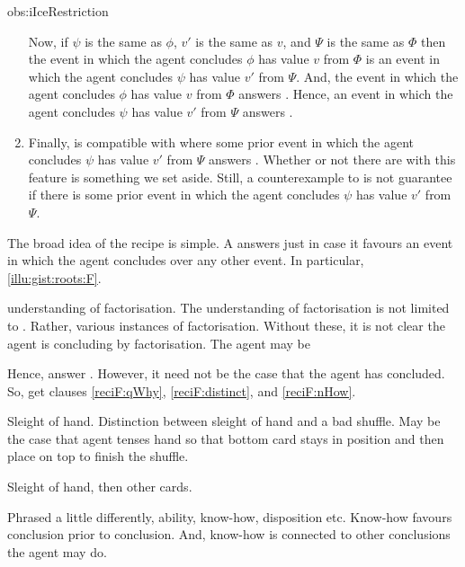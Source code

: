 \begin{note}
\begin{motivation}{obs:iIceRestriction}
\begin{enumerate}
    Now, if \(\psi\) is the same as \(\phi\), \(v'\) is the same as \(v\), and \(\Psi\) is the same as \(\Phi\) then the event in which the agent concludes \(\phi\) has value \(v\) from \(\Phi\) is an event in which the agent concludes \(\psi\) has value \(v'\) from \(\Psi\).
    And, the event in which the agent concludes \(\phi\) has value \(v\) from \(\Phi\) answers \qHow{}.
    Hence, an event in which the agent concludes \(\psi\) has value \(v'\) from \(\Psi\) answers \qHow{}.
  \item
    Finally, \qHow{} is compatible with  where some prior event in which the agent concludes \(\psi\) has value \(v'\) from \(\Psi\) answers \qHow{}.
    Whether or not there are  with this feature is something we set aside.
    Still, a counterexample to \issueInclusion{} is not guarantee if there is some prior event in which the agent concludes \(\psi\) has value \(v'\) from \(\Psi\).
  \end{enumerate}
  \vspace{-\baselineskip}
  \end{motivation}
\end{note}


\begin{note}
  The broad idea of the recipe is simple.
  A \ros{} answers \qWhy{} just in case it favours an event in which the agent concludes over any other event.
  In particular, \autoref{illu:gist:roots:F}.

  \agents{} understanding of factorisation.
  The \agents{} understanding of factorisation is not limited to \ros{}.
  Rather, various instances of factorisation.
  Without these, it is not clear the agent is concluding by factorisation.
  The agent may be 

  Hence,  answer \qWhy{}.
  However, it need not be the case that the agent has concluded.
  So, get clauses \ref{reciF:qWhy}, \ref{reciF:distinct}, and \ref{reciF:nHow}.

  Sleight of hand.
  Distinction between sleight of hand and a bad shuffle.
  May be the case that agent tenses hand so that bottom card stays in position and then place on top to finish the shuffle.

  Sleight of hand, then other cards.

  Phrased a little differently, ability, know-how, disposition etc.
  Know-how favours conclusion prior to conclusion.
  And, know-how is connected to other conclusions the agent may do.
\end{note}


